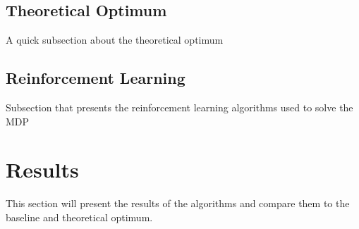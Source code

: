 \documentclass{article}
\theoremstyle{plain}
\theoremstyle{definition}
\theoremstyle{remark}
\begin{document}
\subsection{Theoretical Optimum}
A quick subsection about the theoretical optimum
\subsection{Reinforcement Learning}
Subsection that presents the reinforcement learning algorithms used to solve the MDP

\section{Results}
This section will present the results of the algorithms and compare them to the baseline and theoretical optimum.


\nocite{*}


\end{document}
